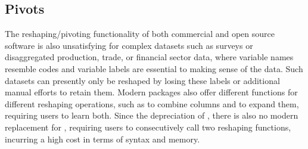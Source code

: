 \documentclass[article]{jss}
\begin{document}
\subsection{Pivots}
%
The reshaping/pivoting functionality of both commercial and open source software is also unsatisfying for complex datasets such as surveys or disaggregated production, trade, or financial sector data, where variable names resemble codes and variable labels are essential to making sense of the data. Such datasets can presently only be reshaped by losing these labels or additional manual efforts to retain them. Modern  packages also offer different functions for different reshaping operations, such as  to combine columns and  to expand them, requiring users to learn both. Since the depreciation of  \citep{rreshape2}, there is also no modern replacement for , requiring  users to consecutively call two reshaping functions, incurring a high cost in terms of syntax and memory. \newline
\end{document}

